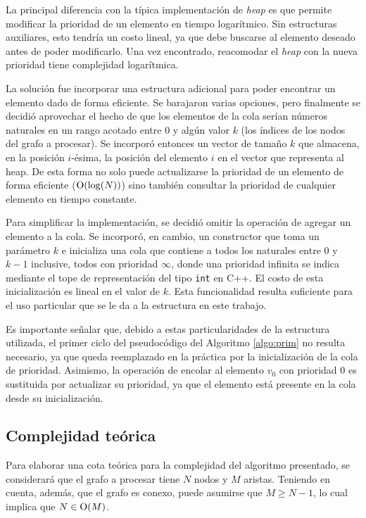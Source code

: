     La principal diferencia con la típica implementación de \emph{heap} es
    que permite modificar la prioridad de un elemento en tiempo
    logarítmico. Sin estructuras auxiliares, esto tendría un costo lineal, ya
    que debe buscarse al elemento deseado antes de poder modificarlo. Una vez
    encontrado, reacomodar el \emph{heap} con la nueva prioridad tiene
    complejidad logarítmica.

    La solución fue incorporar una estructura adicional para poder encontrar
    un elemento dado de forma eficiente. Se barajaron varias opciones, pero
    finalmente se decidió aprovechar el hecho de que los elementos de la cola
    serían números naturales en un rango acotado entre $0$ y algún valor $k$
    (los índices de los nodos del grafo a procesar). Se incorporó entonces un
    vector de tamaño $k$ que almacena, en la posición $i$-ésima, la posición
    del elemento $i$ en el vector que representa al heap. De esta forma no
    solo puede actualizarse la prioridad de un elemento de forma eficiente
    ($\operatorname{O}(\log(N))$) sino también consultar la prioridad de cualquier
    elemento en tiempo constante.

    Para simplificar la implementación, se decidió omitir la operación de
    agregar un elemento a la cola. Se incorporó, en cambio, un constructor que
    toma un parámetro $k$ e inicializa una cola que contiene a todos los
    naturales entre $0$ y $k-1$ inclusive, todos con prioridad $\infty$,
    donde una prioridad infinita se indica mediante el tope de representación
    del tipo \texttt{int} en C++. El costo de esta inicialización es lineal
    en el valor de $k$. Esta funcionalidad resulta suficiente para
    el uso particular que se le da a la estructura en este trabajo.

    Es importante señalar que, debido a estas particularidades de la
    estructura utilizada, el primer ciclo del pseudocódigo del Algoritmo
    \ref{algo:prim} no resulta necesario, ya que queda reemplazado en la
    práctica por la inicialización de la cola de prioridad. Asimismo, la
    operación de encolar al elemento $v_0$ con prioridad $0$ es sustituida
    por actualizar su prioridad, ya que el elemento está presente en la cola
    desde su inicialización.

    \subsection{Complejidad teórica}
    Para elaborar una cota teórica para la complejidad del algoritmo
    presentado, se considerará que el grafo a procesar tiene $N$ nodos y $M$
    aristas.
    Teniendo en cuenta, además, que el grafo es conexo, puede asumirse que
    $M \geq N-1$, lo cual implica que $N \in \operatorname{O}(M)$.

